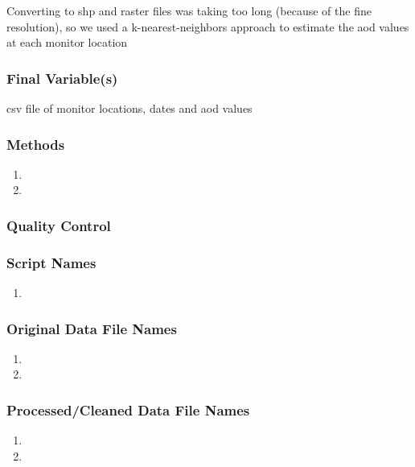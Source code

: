 Converting to shp and raster files was taking too long (because of the fine resolution), so we used a k-nearest-neighbors approach to estimate the aod values at each monitor location


\subsubsection*{Final Variable(s)}
csv file of monitor locations, dates and aod values

\subsubsection*{Methods}

\begin{enumerate}
\item 
\item
\end{enumerate}

\subsubsection*{Quality Control}

\subsubsection*{Script Names}

\begin{enumerate}
\item 
\end{enumerate}

\subsubsection*{Original Data File Names}

\begin{enumerate}
\item 
\item 
\end{enumerate}

\subsubsection*{Processed/Cleaned Data File Names}

\begin{enumerate}
\item 
\item 
\end{enumerate}
